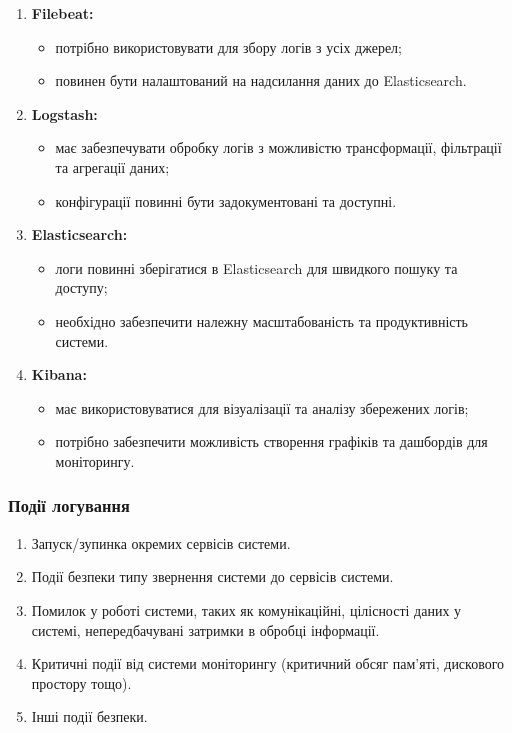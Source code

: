 \documentclass{article}
\begin{document}
\begin{enumerate}
    \item \textbf{Filebeat:}
    \begin{itemize}
        \item потрібно використовувати для збору логів з усіх джерел;
        \item повинен бути налаштований на надсилання даних до Elasticsearch.
    \end{itemize}
    \item \textbf{Logstash:}
    \begin{itemize}
        \item має забезпечувати обробку логів з можливістю трансформації, фільтрації та агрегації даних;
        \item конфігурації повинні бути задокументовані та доступні.
    \end{itemize}
    \item \textbf{Elasticsearch:}
    \begin{itemize}
        \item логи повинні зберігатися в Elasticsearch для швидкого пошуку та доступу;
        \item необхідно забезпечити належну масштабованість та продуктивність системи.
    \end{itemize}
    \item \textbf{Kibana:}
    \begin{itemize}
        \item має використовуватися для візуалізації та аналізу збережених логів;
        \item потрібно забезпечити можливість створення графіків та дашбордів для моніторингу.
    \end{itemize}
\end{enumerate}

\subsubsection{Події логування}

\begin{enumerate}
    \item Запуск/зупинка окремих сервісів системи.
    \item Події безпеки типу звернення системи до сервісів системи.
    \item Помилок у роботі системи, таких як комунікаційні, цілісності даних у системі, непередбачувані затримки в обробці інформації.
    \item Критичні події від системи моніторингу (критичний обсяг пам'яті, дискового простору тощо).
    \item Інші події безпеки.
\end{enumerate}
\end{document}
